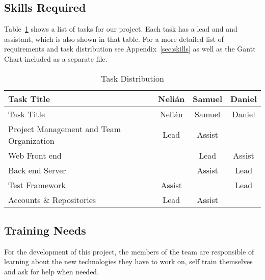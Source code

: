 \subsection{Skills Required}

Table~\ref{tasks} shows a list of tasks for our project. Each task has a lead
and and assistant, which is also shown in that table. For a more detailed list
of requirements and task distribution see Appendix~\ref{sec:skills} as well as
the Gantt Chart included as a separate file.

\begin{center}
\setlength{\extrarowheight}{1.5pt}
  \begin{longtable}{|m{3.25in}|c|c|c|}
 \caption{Task Distribution \label{tasks}} \\
   \hline
  
  \centering Task Title & Nelián & Samuel & Daniel \\
  \hline \hline \endfirsthead
  
     \hline

	\centering Task Title & Nelián & Samuel & Daniel \\  
	\hline \hline \endhead
  
  \endfoot  
  
  Project Management and Team Organization & Lead & Assist & \\ \hline
  Web Front end & & Lead & Assist \\ \hline
  Back end Server & & Assist & Lead \\ \hline
  Test Framework & Assist & & Lead \\ \hline
  Accounts \& Repositories & Lead & Assist & \\ \hline
   \end{longtable}
\end{center}

\subsection{Training Needs}

For the development of this project, the members of the team are responsible of
learning about the new technologies they have to work on, self train themselves
and ask for help when needed.


